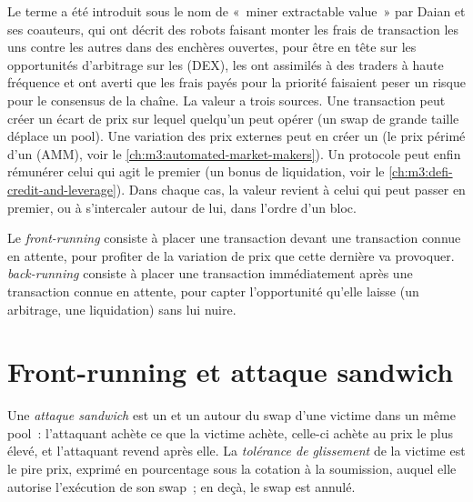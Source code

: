 Le terme a été introduit sous le nom de «~miner extractable value~» par Daian et ses coauteurs, qui ont décrit des robots faisant monter
les frais de transaction les uns contre les autres dans des enchères ouvertes, pour être en tête sur les opportunités d'arbitrage sur les
 (DEX), les ont assimilés à des traders à haute fréquence et ont averti que les frais payés pour la priorité faisaient peser un
risque pour le consensus de la chaîne. La valeur a trois sources. Une transaction peut créer un écart de prix sur lequel
quelqu'un peut opérer (un swap de grande taille déplace un pool). Une variation des prix externes peut en créer un (le prix
périmé d'un  (AMM), voir le \cref{ch:m3:automated-market-makers}). Un protocole peut enfin rémunérer celui qui agit le premier (un
bonus de liquidation, voir le \cref{ch:m3:defi-credit-and-leverage}). Dans chaque cas, la valeur revient à celui qui peut passer en premier, ou
à s'intercaler autour de lui, dans l'ordre d'un bloc.

\begin{definition}\label{def:m3:maximal-extractable-value:front}
Le \emph{front-running} consiste à placer une transaction devant une transaction connue en attente, pour profiter de la
variation de prix que cette dernière va provoquer. \emph{back-running} consiste à placer une transaction
immédiatement après une transaction connue en attente, pour capter l'opportunité qu'elle laisse (un arbitrage, une liquidation) sans
lui nuire.
\end{definition}

\section{Front-running et attaque sandwich}

\begin{definition}\label{def:m3:maximal-extractable-value:sandwich}
Une \emph{attaque sandwich} est un  et un  autour du swap d'une victime dans un même pool~:
l'attaquant achète ce que la victime achète, celle-ci achète au prix le plus élevé, et l'attaquant revend après elle.
La \emph{tolérance de glissement} de la victime est le pire prix, exprimé en pourcentage sous la
cotation à la soumission, auquel elle autorise l'exécution de son swap~; en deçà, le swap est annulé.
\end{definition}

